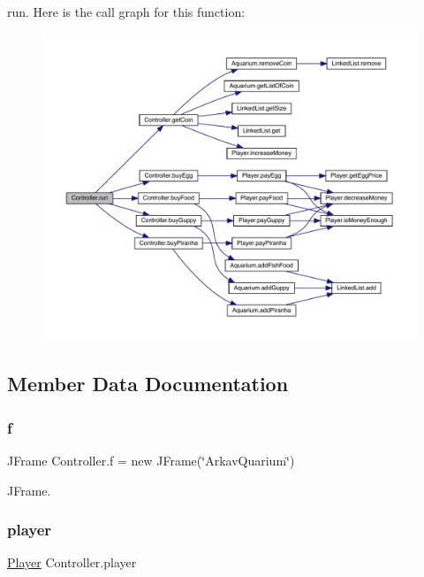 run. Here is the call graph for this function\+:
\nopagebreak
\begin{figure}[H]
\begin{center}
\leavevmode
\includegraphics[width=350pt]{class_controller_a2fcfd8c4d229d4deeec470de95567805_cgraph}
\end{center}
\end{figure}


\subsection{Member Data Documentation}
\mbox{\label{class_controller_a77eb7e2f012edbfa7296d765c3f11b52}} 
\subsubsection{\texorpdfstring{f}{f}}
{\footnotesize\ttfamily J\+Frame Controller.\+f = new J\+Frame(\char`\"{}Arkav\+Quarium\char`\"{})\hspace{0.3cm}{\ttfamily [static]}}

J\+Frame. \mbox{\label{class_controller_a906f3cb8bda1e63ea53825652e155aaf}} 
\subsubsection{\texorpdfstring{player}{player}}
{\footnotesize\ttfamily \mbox{\hyperlink{class_player}{Player}} Controller.\+player\hspace{0.3cm}{\ttfamily [private]}}

